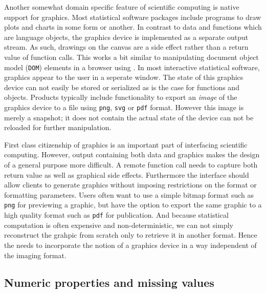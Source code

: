 Another somewhat domain specific feature of scientific computing is native support for graphics. Most statistical software packages include programs to draw plots and charts in some form or another. In contrast to data and functions which are language objects, the graphics device is implemented as a separate output stream. As such, drawings on the canvas are a side effect rather than a return value of function calls. This works a bit similar to manipulating document object model (\texttt{DOM}) elements in a browser using \JavaScript. In most interactive statistical software, graphics appear to the user in a seperate window. The state of this graphics device can not easily be stored or serialized as is the case for functions and objects. Products typically include functionality to export an \emph{image} of the graphics device to a file using \texttt{png}, \texttt{svg} or \texttt{pdf} format. However this image is merely a snapshot; it does not contain the actual state of the device can not be reloaded for further manipulation.

First class citizenship of graphics is an important part of interfacing scientific computing. However, output containing both data and graphics makes the design of a general purpose \API more difficult. A remote function call needs to capture both return value as well as graphical side effects. Furthermore the interface should allow clients to generate graphics without imposing restrictions on the format or formatting parameters. Users often want to use a simple bitmap format such as \texttt{png} for previewing a graphic, but have the option to export the same graphic to a high quality format such as \texttt{pdf} for publication. And because statistical computation is often expensive and non-deterministic, we can not simply reconstruct the grahpic from scratch only to retrieve it in another format. Hence the \API needs to incorporate the notion of a graphics device in a way independent of the imaging format. 

\subsection{Numeric properties and missing values}

